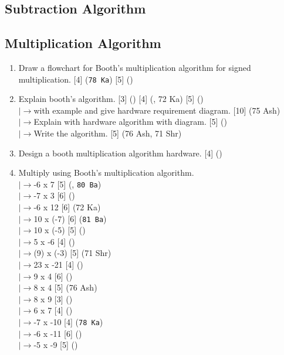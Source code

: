\documentclass[12pt]{article}
\newcommand{\lb}{\\$\left|\rightarrow\right.$}
\begin{document}
	\subsection{Subtraction Algorithm}
	\subsection{Multiplication Algorithm}
		\begin{enumerate}[noitemsep, topsep=0pt]
			\item Draw a flowchart for Booth's multiplication algorithm for signed multiplication. \hfill [4] (\texttt{78 Ka}) [5] ()
			
			\item Explain booth's algorithm. \hfill [3] () [4] (, 72 Ka) [5] ()
			\lb with example and give hardware requirement diagram. \hfill [10] (75 Ash)
			\lb Explain with hardware algorithm with diagram. \hfill [5] ()
			\lb Write the algorithm. \hfill [5] (76 Ash, 71 Shr)
			
			\item Design a booth multiplication algorithm hardware. \hfill [4] ()
			
			\item Multiply using Booth's multiplication algorithm.
				\lb -6 x 7 \hfill [5] (, \texttt{80 Ba})
				\lb -7 x 3 \hfill [6] ()
				\lb -6 x 12 \hfill [6] (72 Ka)
				\lb 10 x (-7) \hfill [6] (\texttt{81 Ba})
				\lb 10 x (-5) \hfill [5] ()
				\lb 5 x -6 \hfill [4] ()
				\lb (9) x (-3) \hfill [5] (71 Shr)
				\lb 23 x -21 \hfill [4] ()
				\lb 9 x 4 \hfill [6] ()
				\lb 8 x 4 \hfill [5] (76 Ash)
				\lb 8 x 9 \hfill [3] ()
				\lb 6 x 7 \hfill [4] ()
				\lb -7 x -10 \hfill [4] (\texttt{78 Ka})
				\lb -6 x -11 \hfill [6] ()
				\lb -5 x -9 \hfill [5] ()
		\end{enumerate}
\end{document}
